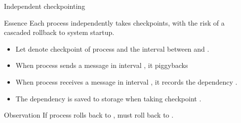 \begin{slide}{Independent checkpointing}
  \begin{block}{Essence}
    Each process independently takes checkpoints, with the risk of a cascaded rollback to system startup.
    \begin{itemize}
    \item<2-> Let  denote  checkpoint of process  and
       the interval between  and .
    \item<3-> When process  sends a message in interval , it piggybacks 
    \item<4-> When process  receives a message in interval , it records the dependency
       \mathexpr{\rightarrow} .
    \item<5-> The dependency  \mathexpr{\rightarrow}  is saved to storage when taking
      checkpoint .
    \end{itemize}
  \end{block}
  \begin{block}{Observation} 
    If process  rolls back to ,  must roll back to . 
  \end{block}
\end{slide}
